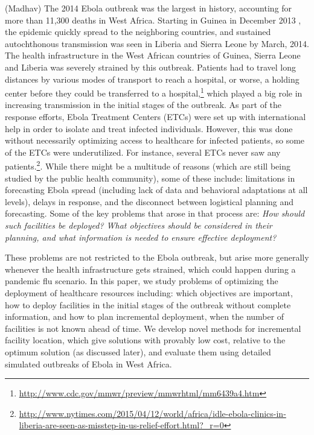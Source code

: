 

(Madhav) The 2014 Ebola outbreak was the largest in history, accounting for more than 11,300
deaths in West Africa. Starting in Guinea in December 2013 \cite{Baize2014}, 
the epidemic quickly spread to the neighboring countries,
and sustained autochthonous transmission was seen in Liberia and Sierra Leone
by March, 2014.  The health infrastructure in the West African countries of Guinea, Sierra Leone and Liberia
was severely strained by this outbreak. Patients had to travel long distances
by various modes of transport to reach a hospital, or worse, a holding center
before they could be transferred to a hospital,\footnote{%
\url{http://www.cdc.gov/mmwr/preview/mmwrhtml/mm6439a4.htm}}
which played a big role in increasing transmission in the initial stages of the outbreak.
As part of the response efforts,
Ebola Treatment Centers (ETCs) were set up with international help
in order to isolate and treat infected individuals.
However, this was done without necessarily
optimizing access to healthcare for infected patients, so some of the ETCs
were underutilized.  For instance, several
ETCs never saw any patients.\footnote{%
\url{http://www.nytimes.com/2015/04/12/world/africa/idle-ebola-clinics-in-liberia-are-seen-as-misstep-in-us-relief-effort.html?_r=0}}.
While there might be a multitude of reasons (which are still being studied by
the public health community), some of these include: limitations in forecasting
Ebola spread (including lack of data and behavioral adaptations at all levels), 
delays in response, and the disconnect between logistical planning and forecasting.
Some of the key problems that arose in that process are: \emph{How should
such facilities be deployed? What objectives should be considered in their planning,
and what information is needed to ensure effective deployment?}

These problems are not restricted to the Ebola outbreak, but arise more generally whenever
the health infrastructure gets strained, which could happen during a pandemic flu scenario.
In this paper, we study problems of optimizing the deployment of healthcare resources including:
which objectives are important, how to deploy facilities in the initial stages of the outbreak
without complete information, and how to plan incremental deployment, when the number
of facilities is not known ahead of time. We develop novel methods for incremental facility
location, which give solutions with provably low cost, relative to the optimum solution
(as discussed later), and evaluate them using detailed simulated outbreaks of
Ebola in West Africa.

